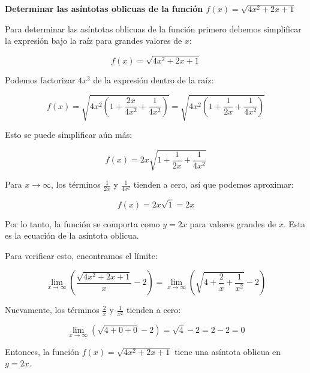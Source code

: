 \documentclass[answers]{exam} %
\begin{document}
\begin{questions}
    \vspace{0.5cm}
    \question \large\textbf{Determinar las asíntotas oblicuas de la función \(f(x)=\sqrt{4x^2+2x+1}\)}
    \begin{solution}
        Para determinar las asíntotas oblicuas de la función primero debemos simplificar la expresión bajo la raíz para grandes valores de \( x \):
    
        \[
        f(x) = \sqrt{4x^2 + 2x + 1}
        \]
    
        Podemos factorizar \( 4x^2 \) de la expresión dentro de la raíz:
    
        \[
        f(x) = \sqrt{4x^2 \left( 1 + \frac{2x}{4x^2} + \frac{1}{4x^2} \right)} = \sqrt{4x^2 \left( 1 + \frac{1}{2x} + \frac{1}{4x^2} \right)}
        \]
    
        Esto se puede simplificar aún más:
    
        \[
        f(x) = 2x \sqrt{1 + \frac{1}{2x} + \frac{1}{4x^2}}
        \]
    
        Para \( x \to \infty \), los términos \(\frac{1}{2x}\) y \(\frac{1}{4x^2}\) tienden a cero, así que podemos aproximar:
    
        \[
        f(x) = 2x \sqrt{1} = 2x
        \]
    
        Por lo tanto, la función se comporta como \( y = 2x \) para valores grandes de \( x \). Esta es la ecuación de la asíntota oblicua.
    
        Para verificar esto, encontramos el límite:
    
        \[
        \lim_{x \to \infty} \left( \frac{\sqrt{4x^2 + 2x + 1}}{x} - 2 \right) = \lim_{x \to \infty} \left( \sqrt{4 + \frac{2}{x} + \frac{1}{x^2}} - 2 \right)
        \]
    
        Nuevamente, los términos \(\frac{2}{x}\) y \(\frac{1}{x^2}\) tienden a cero:
    
        \[
        \lim_{x \to \infty} \left( \sqrt{4 + 0 + 0} - 2 \right) = \sqrt{4} - 2 = 2 - 2 = 0
        \]
    
        Entonces, la función \( f(x) = \sqrt{4x^2 + 2x + 1} \) tiene una asíntota oblicua en \( y = 2x \).
    \end{solution}
    

    \vspace{0.5cm}

    
\end{questions}
\end{document}
